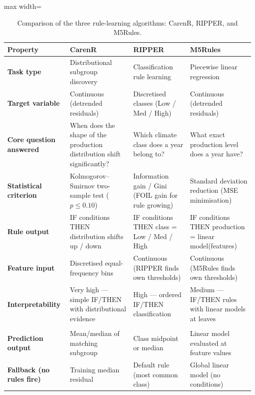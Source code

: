 \begin{table}[htbp]
  \centering
  \caption{Comparison of the three rule-learning algorithms: CarenR, RIPPER, and M5Rules.}\label{tab:ch3a_2}
  \small
  \begin{adjustbox}{max width=\textwidth}
    \begin{tabularx}{\textwidth}{>{\bfseries}p{3cm} X X X}
    \toprule
    Property & \textbf{CarenR} & \textbf{RIPPER} & \textbf{M5Rules} \\
    \midrule
    Task type
      & Distributional subgroup discovery
      & Classification rule learning
      & Piecewise linear regression \\[4pt]
    Target variable
      & Continuous (detrended residuals)
      & Discretised classes (Low / Med / High)
      & Continuous (detrended residuals) \\[4pt]
    Core question answered
      & When does the shape of the production distribution shift significantly?
      & Which climate class does a year belong to?
      & What exact production level does a year have? \\[4pt]
    Statistical criterion
      & Kolmogorov--Smirnov two-sample test ($p \leq 0.10$)
      & Information gain / Gini (FOIL gain for rule growing)
      & Standard deviation reduction (MSE minimisation) \\[4pt]
    Rule output
      & IF conditions THEN distribution shifts up / down
      & IF conditions THEN class = Low / Med / High
      & IF conditions THEN production = linear model(features) \\[4pt]
    Feature input
      & Discretised equal-frequency bins
      & Continuous (RIPPER finds own thresholds)
      & Continuous (M5Rules finds own thresholds) \\[4pt]
    Interpretability
      & Very high --- simple IF/THEN with distributional evidence
      & High --- ordered IF/THEN classification
      & Medium --- IF/THEN rules with linear models at leaves \\[4pt]
    \midrule
    \multicolumn{4}{l}{\normalfont\itshape Operationalisation for prediction in this thesis (Section~\ref{sub:prediction_aggregation_combining_multiple})} \\
    \midrule
    Prediction output
      & Mean/median of matching subgroup
      & Class midpoint or median
      & Linear model evaluated at feature values \\[4pt]
    Fallback (no rules fire)
      & Training median residual
      & Default rule (most common class)
      & Global linear model (no conditions) \\
    \bottomrule
  \end{tabularx}
  \end{adjustbox}

\end{table}



